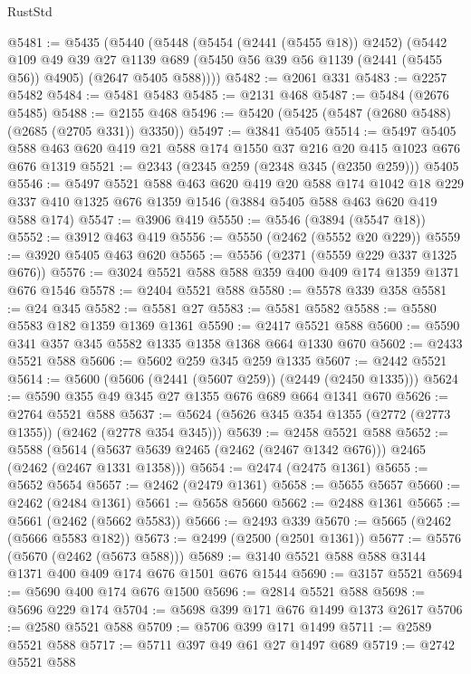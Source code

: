 \begin{lexlean}{RustStd}
\begin{coremodule}
@5481 := @5435
    (@5440
      (@5448
        (@5454 (@2441 (@5455 @18)) @2452)
        (@5442
          @109
          @49
          @39
          @27
          @1139
          @689
          (@5450 @56 @39 @56 @1139 (@2441 (@5455 @56)) @4905)
          (@2647 @5405 @588))))
@5482 := @2061 @331
@5483 := @2257 @5482
@5484 := @5481 @5483
@5485 := @2131 @468
@5487 := @5484 (@2676 @5485)
@5488 := @2155 @468
@5496 := @5420 (@5425 (@5487 (@2680 @5488) (@2685 (@2705 @331)) @3350))
@5497 := @3841 @5405
@5514 := @5497 @5405 @588 @463 @620 @419 @21 @588 @174 @1550 @37 @216 @20 @415 @1023 @676 @676 @1319
@5521 := @2343 (@2345 @259 (@2348 @345 (@2350 @259))) @5405
@5546 := @5497
    @5521
    @588
    @463
    @620
    @419
    @20
    @588
    @174
    @1042
    @18
    @229
    @337
    @410
    @1325
    @676
    @1359
    @1546
    (@3884 @5405 @588 @463 @620 @419 @588 @174)
@5547 := @3906 @419
@5550 := @5546 (@3894 (@5547 @18))
@5552 := @3912 @463 @419
@5556 := @5550 (@2462 (@5552 @20 @229))
@5559 := @3920 @5405 @463 @620
@5565 := @5556 (@2371 (@5559 @229 @337 @1325 @676))
@5576 := @3024 @5521 @588 @588 @359 @400 @409 @174 @1359 @1371 @676 @1546
@5578 := @2404 @5521 @588
@5580 := @5578 @339 @358
@5581 := @24 @345
@5582 := @5581 @27
@5583 := @5581 @5582
@5588 := @5580 @5583 @182 @1359 @1369 @1361
@5590 := @2417 @5521 @588
@5600 := @5590 @341 @357 @345 @5582 @1335 @1358 @1368 @664 @1330 @670
@5602 := @2433 @5521 @588
@5606 := @5602 @259 @345 @259 @1335
@5607 := @2442 @5521
@5614 := @5600 (@5606 (@2441 (@5607 @259)) (@2449 (@2450 @1335)))
@5624 := @5590 @355 @49 @345 @27 @1355 @676 @689 @664 @1341 @670
@5626 := @2764 @5521 @588
@5637 := @5624 (@5626 @345 @354 @1355 (@2772 (@2773 @1355)) (@2462 (@2778 @354 @345)))
@5639 := @2458 @5521 @588
@5652 := @5588
    (@5614 (@5637 @5639 @2465 (@2462 (@2467 @1342 @676))) @2465 (@2462 (@2467 @1331 @1358)))
@5654 := @2474 (@2475 @1361)
@5655 := @5652 @5654
@5657 := @2462 (@2479 @1361)
@5658 := @5655 @5657
@5660 := @2462 (@2484 @1361)
@5661 := @5658 @5660
@5662 := @2488 @1361
@5665 := @5661 (@2462 (@5662 @5583))
@5666 := @2493 @339
@5670 := @5665 (@2462 (@5666 @5583 @182))
@5673 := @2499 (@2500 (@2501 @1361))
@5677 := @5576 (@5670 (@2462 (@5673 @588)))
@5689 := @3140 @5521 @588 @588 @3144 @1371 @400 @409 @174 @676 @1501 @676 @1544
@5690 := @3157 @5521
@5694 := @5690 @400 @174 @676 @1500
@5696 := @2814 @5521 @588
@5698 := @5696 @229 @174
@5704 := @5698 @399 @171 @676 @1499 @1373 @2617
@5706 := @2580 @5521 @588
@5709 := @5706 @399 @171 @1499
@5711 := @2589 @5521 @588
@5717 := @5711 @397 @49 @61 @27 @1497 @689
@5719 := @2742 @5521 @588

\end{coremodule}
\end{lexlean}
